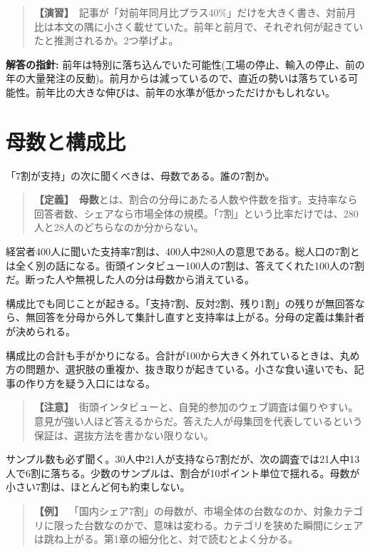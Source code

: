\documentclass{article}
\begin{document}
\begin{quote}
\textbf{【演習】}\ 記事が「対前年同月比プラス40\%」だけを大きく書き、対前月比は本文の隅に小さく載せていた。前年と前月で、それぞれ何が起きていたと推測されるか。2つ挙げよ。
\end{quote}

\textbf{解答の指針:} 前年は特別に落ち込んでいた可能性(工場の停止、輸入の停止、前の年の大量発注の反動)。前月からは減っているので、直近の勢いは落ちている可能性。前年比の大きな伸びは、前年の水準が低かっただけかもしれない。

\section{母数と構成比}

「7割が支持」の次に聞くべきは、母数である。誰の7割か。

\begin{quote}
\textbf{【定義】}\ \textbf{母数}とは、割合の分母にあたる人数や件数を指す。支持率なら回答者数、シェアなら市場全体の規模。「7割」という比率だけでは、280人と28人のどちらなのか分からない。
\end{quote}

経営者400人に聞いた支持率7割は、400人中280人の意思である。総人口の7割とは全く別の話になる。街頭インタビュー100人の7割は、答えてくれた100人の7割だ。断った人や無視した人の分は母数から消えている。

構成比でも同じことが起きる。「支持7割、反対2割、残り1割」の残りが無回答なら、無回答を分母から外して集計し直すと支持率は上がる。分母の定義は集計者が決められる。

構成比の合計も手がかりになる。合計が100から大きく外れているときは、丸め方の問題か、選択肢の重複か、抜き取りが起きている。小さな食い違いでも、記事の作り方を疑う入口にはなる。

\begin{quote}
\textbf{【注意】}\ 街頭インタビューと、自発的参加のウェブ調査は偏りやすい。意見が強い人ほど答えるからだ。答えた人が母集団を代表しているという保証は、選抜方法を書かない限りない。
\end{quote}

サンプル数も必ず聞く。30人中21人が支持なら7割だが、次の調査では21人中13人で6割に落ちる。少数のサンプルは、割合が10ポイント単位で揺れる。母数が小さい7割は、ほとんど何も約束しない。

\begin{quote}
\textbf{【例】}\ 「国内シェア7割」の母数が、市場全体の台数なのか、対象カテゴリに限った台数なのかで、意味は変わる。カテゴリを狭めた瞬間にシェアは跳ね上がる。第1章の細分化と、対で読むとよく分かる。
\end{quote}
\end{document}
